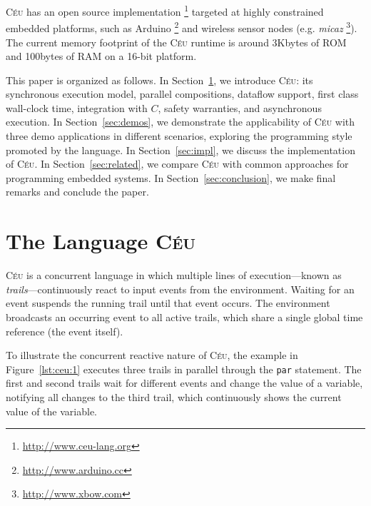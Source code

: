 \documentclass[11pt,a4paper]{article}
\newcommand{\2}{\;\;}
\newcommand{\5}{\;\;\;\;\;}
\newcommand{\CEU}{\textsc{C\'{e}u}}
\newcommand{\code}[1] {{\small{\texttt{#1}}}}
\begin{document}
\CEU{} has an open source implementation%
\footnote{\url{http://www.ceu-lang.org}}
targeted at highly constrained embedded platforms, such as Arduino%
\footnote{\url{http://www.arduino.cc}}
and wireless sensor nodes (e.g. \emph{micaz}%
\footnote{\url{http://www.xbow.com}}).
The current memory footprint of the \CEU{} runtime is around 3Kbytes of ROM and 
100bytes of RAM on a 16-bit platform.

This paper is organized as follows.
In Section~\ref{sec:ceu}, we introduce \CEU: its synchronous execution model, 
parallel compositions, dataflow support, first class wall-clock time, 
integration with $C$, safety warranties, and asynchronous execution.
In Section~\ref{sec:demos}, we demonstrate the applicability of \CEU{} with 
three demo applications in different scenarios, exploring the programming style 
promoted by the language.
In Section~\ref{sec:impl}, we discuss the implementation of \CEU.
In Section~\ref{sec:related}, we compare \CEU{} with common approaches for 
programming embedded systems.
In Section~\ref{sec:conclusion}, we make final remarks and conclude the paper.

\section{The Language \CEU}
\label{sec:ceu}

\CEU{} is a concurrent language in which multiple lines of execution---known as 
\emph{trails}---continuously react to input events from the environment.
Waiting for an event suspends the running trail until that event occurs.
The environment broadcasts an occurring event to all active trails, which share 
a single global time reference (the event itself).

To illustrate the concurrent reactive nature of \CEU{}, the example in 
Figure~\ref{lst:ceu:1} executes three trails in parallel through the \code{par} 
statement.
The first and second trails wait for different events and change the value of a 
variable, notifying all changes to the third trail, which continuously shows 
the current value of the variable.
 
\end{document}
